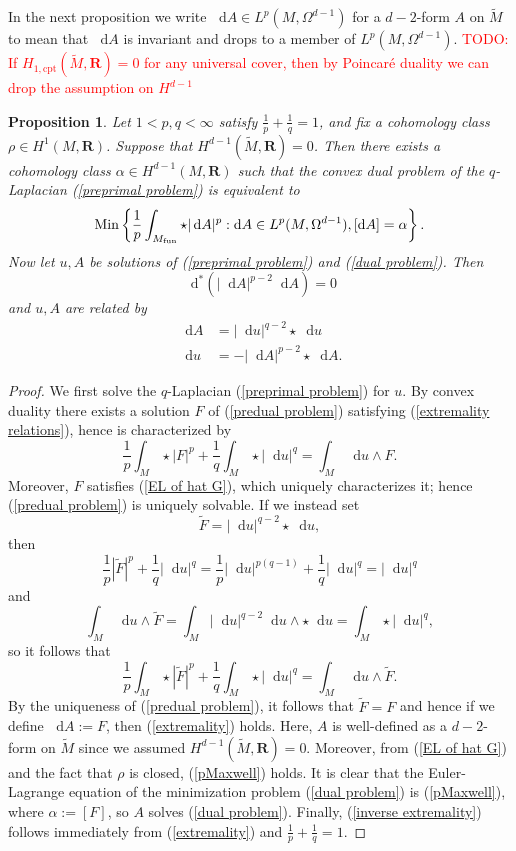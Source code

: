 \documentclass[reqno,11pt]{amsart}
\newcommand{\RR}{\mathbf{R}}
\newcommand*\dif{\mathop{}\!\mathrm{d}}
\newcommand{\Min}{\mathrm{Min}}
\newcommand{\cpt}{\mathrm{cpt}}
\newtheorem{proposition}[theorem]{Proposition}
\theoremstyle{definition}
\numberwithin{equation}{section}
\newcommand\todo[1]{\textcolor{red}{TODO: #1}}
\begin{document}
In the next proposition we write $\dif A \in L^p(M, \Omega^{d - 1})$ for a $d-2$-form $A$ on $\tilde M$ to mean that $\dif A$ is invariant and drops to a member of $L^p(M, \Omega^{d - 1})$.
\todo{If $H_{1, \cpt}(\tilde M, \RR) = 0$ for any universal cover, then by Poincar\'e duality we can drop the assumption on $H^{d - 1}$}

\begin{proposition}\label{convex duality}
Let $1 < p, q < \infty$ satisfy $\frac{1}{p} + \frac{1}{q} = 1$, and fix a cohomology class $\rho \in H^1(M, \RR)$.
Suppose that $H^{d - 1}(\tilde M, \RR) = 0$.
Then there exists a cohomology class $\alpha \in H^{d - 1}(M, \RR)$ such that the convex dual problem of the $q$-Laplacian (\ref{preprimal problem}) is equivalent to 
\begin{equation}\label{dual problem}
\Min\left\{\frac{1}{p} \int_{M_{\rm fun}} \star |\dif A|^p: \dif A \in L^p(M, \Omega^{d - 1}), [\dif A] = \alpha\right\}.
\end{equation}
Now let $u, A$ be solutions of (\ref{preprimal problem}) and (\ref{dual problem}). Then
\begin{equation}\label{pMaxwell}
\dif^*(|\dif A|^{p - 2} \dif A) = 0
\end{equation}
and $u, A$ are related by
\begin{align}
\dif A &= |\dif u|^{q - 2} \star \dif u \label{extremality} \\
\dif u &= -|\dif A|^{p - 2} \star \dif A. \label{inverse extremality}
\end{align}
\end{proposition}
\begin{proof}
We first solve the $q$-Laplacian (\ref{preprimal problem}) for $u$.
By convex duality \cite[Chapter III, Theorem 4.2]{Ekeland99} there exists a solution $F$ of (\ref{predual problem}) satisfying (\ref{extremality relations}), hence is characterized by 
$$\frac{1}{p} \int_M \star |F|^p + \frac{1}{q} \int_M \star |\dif u|^q = \int_M \dif u \wedge F.$$
Moreover, $F$ satisfies (\ref{EL of hat G}), which uniquely characterizes it; hence (\ref{predual problem}) is uniquely solvable.
If we instead set
$$\tilde F = |\dif u|^{q - 2} \star \dif u,$$
then 
$$\frac{1}{p} |\tilde F|^p + \frac{1}{q} |\dif u|^q = \frac{1}{p} |\dif u|^{p(q - 1)} + \frac{1}{q} |\dif u|^q = |\dif u|^q$$
and 
$$\int_M \dif u \wedge \tilde F = \int_M |\dif u|^{q - 2} \dif u \wedge \star \dif u = \int_M \star |\dif u|^q,$$
so it follows that 
$$\frac{1}{p} \int_M \star |\tilde F|^p + \frac{1}{q} \int_M \star |\dif u|^q = \int_M \dif u \wedge \tilde F.$$
By the uniqueness of (\ref{predual problem}), it follows that $\tilde F = F$ and hence if we define $\dif A := F$, then (\ref{extremality}) holds.
Here, $A$ is well-defined as a $d-2$-form on $\tilde M$ since we assumed $H^{d - 1}(\tilde M, \RR) = $0.
Moreover, from (\ref{EL of hat G}) and the fact that $\rho$ is closed, (\ref{pMaxwell}) holds.
It is clear that the Euler-Lagrange equation of the minimization problem (\ref{dual problem}) is (\ref{pMaxwell}), where $\alpha := [F]$, so $A$ solves (\ref{dual problem}).
Finally, (\ref{inverse extremality}) follows immediately from (\ref{extremality}) and $\frac{1}{p} + \frac{1}{q} = 1$.
\end{proof}
\end{document}
